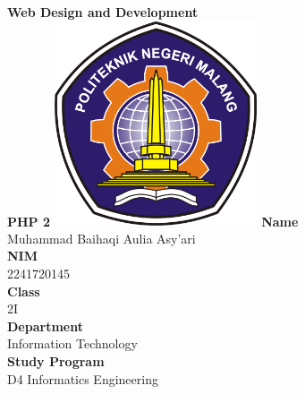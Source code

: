 \documentclass[12pt,titlepage]{article}
\newcommand{\vSubject}{Web Design and Development}
\newcommand{\vSubtitle}{PHP 2}
\newcommand{\vName}{Muhammad Baihaqi Aulia Asy'ari}
\newcommand{\vNIM}{2241720145}
\newcommand{\vClass}{2I}
\newcommand{\vDepartment}{Information Technology}
\newcommand{\vStudyProgram}{D4 Informatics Engineering}
\begin{document}
\begin{titlepage}
    \centering
    \vfill
    {\bfseries\LARGE
        \vSubject\\
        \vskip0.25cm
        \vSubtitle
    }
    \vfill
    \includegraphics[width=6cm]{images/polinema-logo.png}
    \vfill
    {
        \textbf{Name}\\
        \vName\\
        \vskip0.5cm
        \textbf{NIM}\\
        \vNIM\\
        \vskip0.5cm
        \textbf{Class}\\
        \vClass\\
        \vskip0.5cm
        \textbf{Department}\\
        \vDepartment\\
        \vskip0.5cm
        \textbf{Study Program}\\
        \vStudyProgram
    }
\end{titlepage}

\newpage
\end{document}
